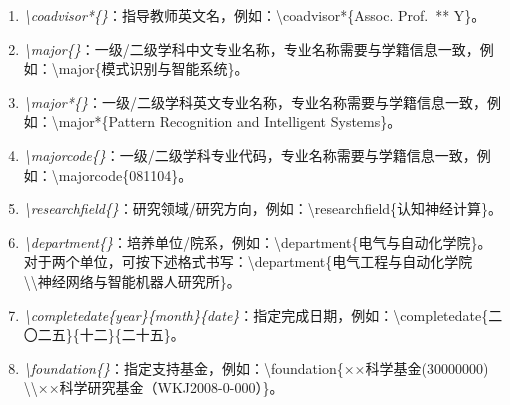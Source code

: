 \begin{enumerate}
    \item \emph{\backslash coadvisor*\{\}}：指导教师英文名，例如：\backslash coadvisor*\{Assoc. Prof.~** Y\}。
    \item \emph{\backslash major\{\}}：一级/二级学科中文专业名称，专业名称需要与学籍信息一致，例如：\backslash major\{模式识别与智能系统\}。
    \item \emph{\backslash major*\{\}}：一级/二级学科英文专业名称，专业名称需要与学籍信息一致，例如：\backslash major*\{Pattern Recognition and Intelligent Systems\}。
    \item \emph{\backslash majorcode\{\}}：一级/二级学科专业代码，专业名称需要与学籍信息一致，例如：\backslash majorcode\{081104\}。
    \item \emph{\backslash researchfield\{\}}：研究领域/研究方向，例如：\backslash researchfield\{认知神经计算\}。
    \item \emph{\backslash department\{\}}：培养单位/院系，例如：\backslash department\{电气与自动化学院\}。对于两个单位，可按下述格式书写：\backslash department\{电气工程与自动化学院 \backslash\backslash 神经网络与智能机器人研究所\}。
    \item \emph{\backslash completedate\{year\}\{month\}\{date\}}：指定完成日期，例如：\backslash completedate\{二〇二五\}\{十二\}\{二十五\}。
    \item \emph{\backslash foundation\{\}}：指定支持基金，例如：\backslash foundation\{××科学基金(30000000) \backslash\backslash ××科学研究基金（WKJ2008-0-000）\}。
\end{enumerate}